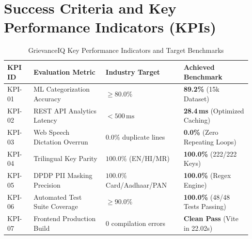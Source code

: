 \section{Success Criteria and Key Performance Indicators (KPIs)}
\begin{table}[h]
\centering
\caption{GrievanceIQ Key Performance Indicators and Target Benchmarks}
\label{tab:kpi_benchmarks}
\begin{tabular}{|p{1.2cm}|p{5.5cm}|p{3.8cm}|p{4.0cm}|}
\hline
\textbf{KPI ID} & \textbf{Evaluation Metric} & \textbf{Industry Target} & \textbf{Achieved Benchmark} \\ \hline
KPI-01 & ML Categorization Accuracy & $\ge 80.0\%$ & \textbf{89.2\%} (15k Dataset) \\ \hline
KPI-02 & REST API Analytics Latency & $< 500\,\text{ms}$ & \textbf{28.4\,ms} (Optimized Caching) \\ \hline
KPI-03 & Web Speech Dictation Overrun & $0.0\%$ duplicate lines & \textbf{0.0\%} (Zero Repeating Loops) \\ \hline
KPI-04 & Trilingual Key Parity & $100.0\%$ (EN/HI/MR) & \textbf{100.0\%} (222/222 Keys) \\ \hline
KPI-05 & DPDP PII Masking Precision & $100.0\%$ Card/Aadhaar/PAN & \textbf{100.0\%} (Regex Engine) \\ \hline
KPI-06 & Automated Test Suite Coverage & $\ge 90.0\%$ & \textbf{100.0\%} (48/48 Tests Passing) \\ \hline
KPI-07 & Frontend Production Build & 0 compilation errors & \textbf{Clean Pass} (Vite in 22.02s) \\ \hline
\end{tabular}
\end{table}
